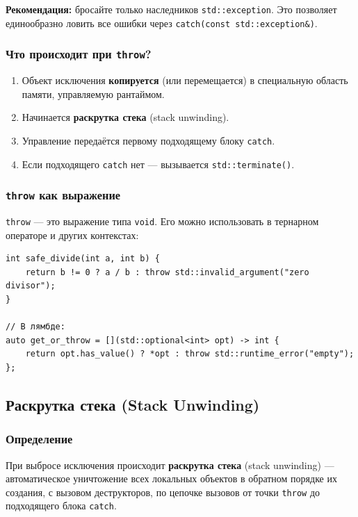 \documentclass[a4paper,12pt]{article}
\begin{document}
\textbf{Рекомендация:} бросайте только наследников \texttt{std::exception}.
Это позволяет единообразно ловить все ошибки через
\texttt{catch(const std::exception\&)}.

\subsubsection{Что происходит при \texttt{throw}?}

\begin{enumerate}
    \item Объект исключения \textbf{копируется} (или перемещается) в специальную
          область памяти, управляемую рантаймом.
    \item Начинается \textbf{раскрутка стека} (stack unwinding).
    \item Управление передаётся первому подходящему блоку \texttt{catch}.
    \item Если подходящего \texttt{catch} нет --- вызывается
          \texttt{std::terminate()}.
\end{enumerate}

\subsubsection{\texttt{throw} как выражение}

\texttt{throw} --- это выражение типа \texttt{void}. Его можно использовать
в тернарном операторе и других контекстах:

\begin{lstlisting}
int safe_divide(int a, int b) {
    return b != 0 ? a / b : throw std::invalid_argument("zero divisor");
}

// В лямбде:
auto get_or_throw = [](std::optional<int> opt) -> int {
    return opt.has_value() ? *opt : throw std::runtime_error("empty");
};
\end{lstlisting}

\subsection{Раскрутка стека (Stack Unwinding)}

\subsubsection{Определение}

При выбросе исключения происходит \textbf{раскрутка стека} (stack
unwinding) --- автоматическое уничтожение всех локальных объектов
в обратном порядке их создания, с вызовом деструкторов, по цепочке
вызовов от точки \texttt{throw} до подходящего блока \texttt{catch}.
\end{document}
